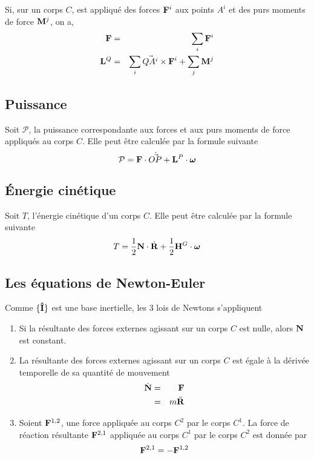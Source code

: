 Si, sur un corps $C$, est appliqué des forces ${\bf F}^i$ aux points $A^i$ et des purs moments de force ${\bf M}^j$, on a,
\begin{eqnarray*}
	{\bf F} &=& \sum_i {\bf F}^i\\
	{\bf L}^Q &=&  \sum_i \vec{QA^i}\times{\bf F}^i + \sum_j {\bf M}^j
\end{eqnarray*}

\subsection{Puissance}
Soit $\mathcal{P}$, la puissance correspondante aux forces et aux purs moments de force appliqués au corps $C$.
Elle peut être calculée par la formule suivante
\[ \mathcal{P} = {\bf F}\cdot\dot{\vec{ OP}} + {\bf L}^P\cdot{\bm \omega} \]

\subsection{\'Energie cinétique}
Soit $T$, l'énergie cinétique d'un corps $C$.
Elle peut être calculée par la formule suivante
\[ T = \frac{1}{2} {\bf N} \cdot \dot{\bf R} + \frac{1}{2} {\bf H}^G \cdot {\bm \omega} \]

\subsection{Les équations de Newton-Euler}
Comme $\{{\bf\hat{I}}\}$ est une base inertielle, les 3 lois de Newtons s'appliquent
\begin{enumerate}
	\item Si la résultante des forces externes agissant sur un corps $C$ est nulle, alors ${\bf N}$ est constant.
	\item La résultante des forces externes agissant sur un corps $C$ est égale à la dérivée temporelle de sa quantité de mouvement
		\begin{eqnarray*}
			\dot{{\bf N}} &=& {\bf F}\\
			&=& m \ddot{\bf R}
		\end{eqnarray*}
	\item Soient ${\bf F}^{1,2}$, une force appliquée au corps $C^2$ par le corps $C^1$.
		La force de réaction résultante ${\bf F}^{2,1}$ appliquée au corps $C^1$ par le corps $C^2$ est donnée par
		\[ {\bf F}^{2,1} = -{\bf F}^{1,2} \]
\end{enumerate}


